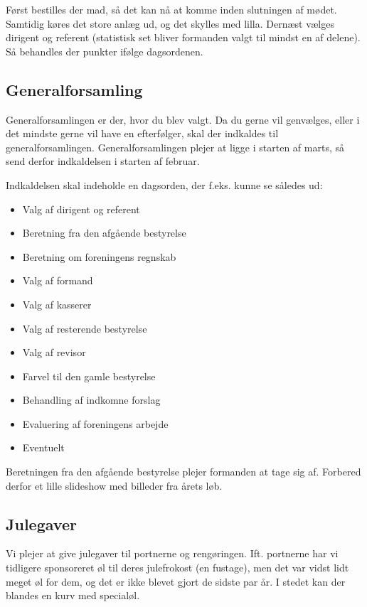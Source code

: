 Først bestilles der mad, så det kan nå at komme inden slutningen af
mødet. Samtidig køres det store anlæg ud, og det skylles med
lilla. Dernæst vælges dirigent og referent (statistisk set bliver
formanden valgt til mindst en af delene). Så behandles der punkter
ifølge dagsordenen.

\subsection{Generalforsamling}
\label{sec:generalforsamling}

Generalforsamlingen er der, hvor du blev valgt. Da du gerne vil
genvælges, eller i det mindste gerne vil have en efterfølger, skal der
indkaldes til generalforsamlingen. Generalforsamlingen plejer at ligge
i starten af marts, så send derfor indkaldelsen i starten af februar.

Indkaldelsen skal indeholde en dagsorden, der f.eks. kunne se således
ud:
\begin{itemize}
\item Valg af dirigent og referent
\item Beretning fra den afgående bestyrelse
\item Beretning om foreningens regnskab
\item Valg af formand
\item Valg af kasserer
\item Valg af resterende bestyrelse
\item Valg af revisor
\item Farvel til den gamle bestyrelse
\item Behandling af indkomne forslag
\item Evaluering af foreningens arbejde
\item Eventuelt
\end{itemize}

Beretningen fra den afgående bestyrelse plejer formanden at tage sig
af. Forbered derfor et lille slideshow med billeder fra årets løb.


\subsection{Julegaver}
\label{sec:julegaver}

Vi plejer at give julegaver til portnerne og
rengøringen. Ift. portnerne har vi tidligere sponsoreret øl til deres
julefrokost (en fustage), men det var vidst lidt meget øl for dem, og
det er ikke blevet gjort de sidste par år. I stedet kan der blandes en
kurv med specialøl.

